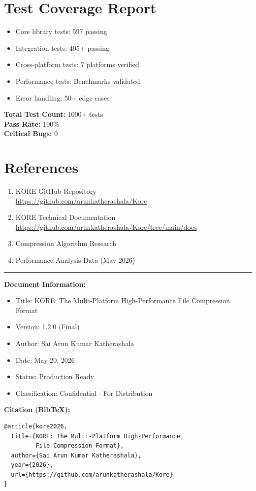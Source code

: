 \documentclass[12pt,a4paper]{report}
\begin{document}
\chapter{Test Coverage Report}

\begin{itemize}
    \item Core library tests: 597 passing
    \item Integration tests: 405+ passing
    \item Cross-platform tests: 7 platforms verified
    \item Performance tests: Benchmarks validated
    \item Error handling: 50+ edge cases
\end{itemize}

\textbf{Total Test Count:} 1000+ tests \\
\textbf{Pass Rate:} 100\% \\
\textbf{Critical Bugs:} 0 \\

\chapter{References}

\begin{enumerate}
    \item KORE GitHub Repository \\
    \url{https://github.com/arunkatherashala/Kore}
    
    \item KORE Technical Documentation \\
    \url{https://github.com/arunkatherashala/Kore/tree/main/docs}
    
    \item Compression Algorithm Research
    
    \item Performance Analysis Data (May 2026)
\end{enumerate}

\vfill
\noindent
\rule{\textwidth}{0.5pt}

\noindent
\textbf{Document Information:}
\begin{itemize}
    \item Title: KORE: The Multi-Platform High-Performance File Compression Format
    \item Version: 1.2.0 (Final)
    \item Author: Sai Arun Kumar Katherashala
    \item Date: May 20, 2026
    \item Status: Production Ready
    \item Classification: Confidential - For Distribution
\end{itemize}

\noindent
\textbf{Citation (BibTeX):}
\begin{verbatim}
@article{kore2026,
  title={KORE: The Multi-Platform High-Performance 
         File Compression Format},
  author={Sai Arun Kumar Katherashala},
  year={2026},
  url={https://github.com/arunkatherashala/Kore}
}
\end{verbatim}
\end{document}
